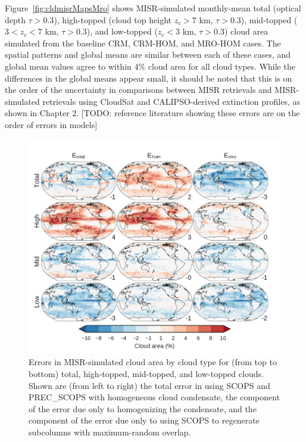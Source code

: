 Figure~\ref{fig:cldmisrMapsMro} shows MISR-simulated monthly-mean total
(optical depth \(\tau > 0.3\)), high-topped (cloud top height
\(z_c > 7\) km, \(\tau > 0.3\)), mid-topped (\(3 < z_c < 7\) km,
\(\tau > 0.3\)), and low-topped (\(z_c < 3\) km, \(\tau > 0.3\)) cloud
area simulated from the baseline CRM, CRM-HOM, and MRO-HOM cases. The
spatial patterns and global means are similar between each of these
cases, and global mean values agree to within 4\% cloud area for all
cloud types. While the differences in the global means appear small, it
should be noted that this is on the order of the uncertainty in
comparisons between MISR retrievals and MISR-simulated retrievals using
CloudSat and CALIPSO-derived extinction profiles, as shown in Chapter 2.
{[}TODO: reference literature showing these errors are on the order of
errors in models{]}

\begin{figure}[htbp]
\centering
\includegraphics{graphics/subgrid1_cldmisr_maps_diff.pdf}
\caption{\label{fig:cldmisrMapsMroDiff}Errors in MISR-simulated cloud
area by cloud type for (from top to bottom) total, high-topped,
mid-topped, and low-topped clouds. Shown are (from left to right) the
total error in using SCOPS and PREC\_SCOPS with homogeneous cloud
condensate, the component of the error due only to homogenizing the
condensate, and the component of the error due only to using SCOPS to
regenerate subcolumns with maximum-random
overlap.}\label{fig:cldmisrMapsMroDiff}
\end{figure}

